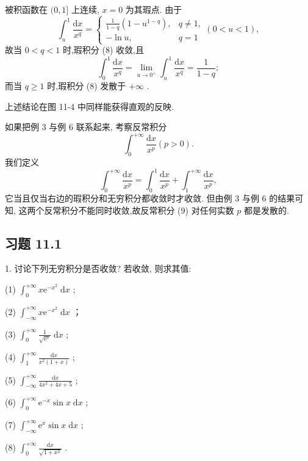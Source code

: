 \begin{solution}

\end{solution}
被积函数在 \((0,1\rbrack\) 上连续, \(x = 0\) 为其瑕点. 由于
\[
{\int }_{u}^{1}\frac{\mathrm{d}x}{{x}^{q}} = \left\{  {\begin{array}{ll} \frac{1}{1 - q}\left( {1 - {u}^{1 - q}}\right) , & q \neq  1, \\   - \ln u, & q = 1 \end{array}\left( {0 < u < 1}\right) ,}\right.
\]
故当 \(0 < q < 1\) 时,瑕积分 (8) 收敛,且
\[
{\int }_{0}^{1}\frac{\mathrm{d}x}{{x}^{q}} = \mathop{\lim }\limits_{{u \rightarrow  {0}^{ + }}}{\int }_{u}^{1}\frac{\mathrm{d}x}{{x}^{q}} = \frac{1}{1 - q};
\]
而当 \(q \geq  1\) 时,瑕积分 (8) 发散于 \(+ \infty\) .

上述结论在图 11-4 中同样能获得直观的反映.

如果把例 3 与例 6 联系起来, 考察反常积分
\[
{\int }_{0}^{+\infty }\frac{\mathrm{d}x}{{x}^{p}}\left( {p > 0}\right) . \tag{9}
\]
我们定义
\[
{\int }_{0}^{+\infty }\frac{\mathrm{d}x}{{x}^{p}} = {\int }_{0}^{1}\frac{\mathrm{d}x}{{x}^{p}} + {\int }_{1}^{+\infty }\frac{\mathrm{d}x}{{x}^{p}},
\]
它当且仅当右边的瑕积分和无穷积分都收敛时才收敛. 但由例 3 与例 6 的结果可知, 这两个反常积分不能同时收敛,故反常积分 (9) 对任何实数 \(p\) 都是发散的.

\subsection{习题 11.1}

1. 讨论下列无穷积分是否收敛? 若收敛, 则求其值:

(1) \({\int }_{0}^{+\infty }x{\mathrm{e}}^{-{x}^{2}}\mathrm{\;d}x\) ;

(2) \({\int }_{-\infty }^{+\infty }x{\mathrm{e}}^{-{x}^{2}}\mathrm{\;d}x\) ；

(3) \({\int }_{0}^{+\infty }\frac{1}{\sqrt{{\mathrm{e}}^{x}}}\mathrm{\;d}x\) ;

(4) \({\int }_{1}^{+\infty }\frac{\mathrm{d}x}{{x}^{2}\left( {1 + x}\right) }\) ;

(5) \({\int }_{-\infty }^{+\infty }\frac{\mathrm{d}x}{4{x}^{2} + {4x} + 5}\) ;

(6) \({\int }_{0}^{+\infty }{\mathrm{e}}^{-x}\sin x\mathrm{\;d}x\) ;

(7) \({\int }_{-\infty }^{+\infty }{\mathrm{e}}^{x}\sin x\mathrm{\;d}x\) ;

(8) \({\int }_{0}^{+\infty }\frac{\mathrm{d}x}{\sqrt{1 + {x}^{2}}}\) .

